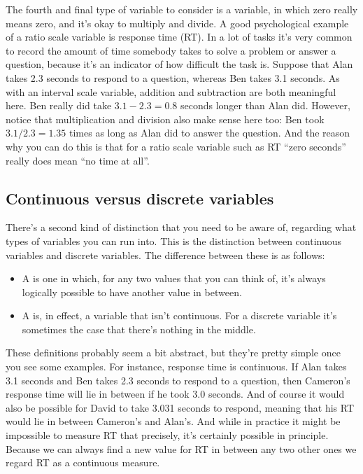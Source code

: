 The fourth and final type of variable to consider is a  variable, in which zero really means zero, and it's okay to multiply and divide. A good psychological example of a ratio scale variable is response time (RT). In a lot of tasks it's very common to record the amount of time somebody takes to solve a problem or answer a question, because it's an indicator of how difficult the task is. Suppose that Alan takes 2.3 seconds to respond to a question, whereas Ben takes 3.1 seconds. As with an interval scale variable, addition and subtraction are both meaningful here. Ben really did take $3.1 - 2.3 = 0.8$ seconds longer than Alan did. However, notice that multiplication and division also make sense here too: Ben took $3.1 / 2.3 = 1.35$ times as long as Alan did to answer the question. And the reason why you can do this is that for a ratio scale variable such as RT ``zero seconds'' really does mean ``no time at all''.

\subsection{Continuous versus discrete variables~\label{sec:continuousdiscrete}}

There's a second kind of distinction that you need to be aware of, regarding what types of variables you can run into. This is the distinction between continuous variables and discrete variables. The difference between these is as follows:

\begin{itemize}
\item A  is one in which, for any two values that you can think of, it's always logically possible to have another value in between. 
\item A  is, in effect, a variable that isn't continuous. For a discrete variable it's sometimes the case that there's nothing in the middle.
\end{itemize}

These definitions probably seem a bit abstract, but they're pretty simple once you see some examples. For instance, response time is continuous. If Alan takes 3.1 seconds and Ben takes 2.3 seconds to respond to a question, then Cameron's response time will lie in between if he took 3.0 seconds. And of course it would also be possible for David to take 3.031 seconds to respond, meaning that his RT would lie in between Cameron's and Alan's. And while in practice it might be impossible to measure RT that precisely, it's certainly possible in principle. Because we can always find a new value for RT in between any two other ones we regard RT as a continuous measure.  

